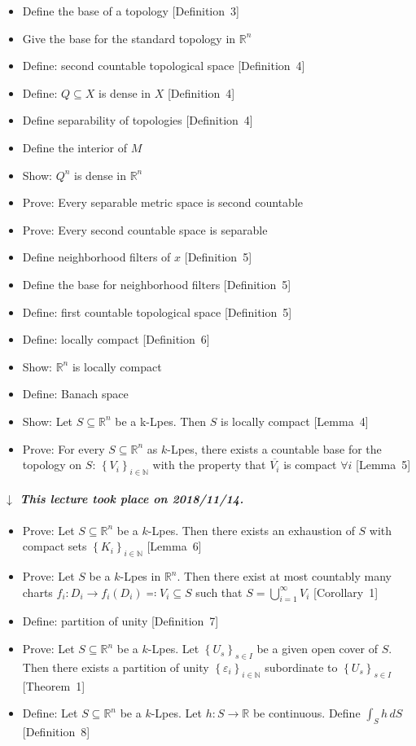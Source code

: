\documentclass{article}
\numberwithin{lecref}{section}
\newcommand{\Set}[1]{\left\{#1\right\}}
\newcommand{\dateref}[1]{%
  \begin{mdframed}[backgroundcolor=gray!10,innerbottommargin=0pt,innertopmargin=0pt]
    \paragraph{\textit{$\downarrow$ This lecture took place on #1.}}%
  \end{mdframed}%
}
\begin{document}
\begin{itemize}
  \item Define the base of a topology [Definition~3]
  \item Give the base for the standard topology in $\mathbb R^n$
  \item Define: second countable topological space [Definition~4]
  \item Define: $Q \subseteq X$ is dense in $X$ [Definition~4]
  \item Define separability of topologies [Definition~4]
  \item Define the interior of $M$
  \item Show: $Q^n$ is dense in $\mathbb R^n$
  \item Prove: Every separable metric space is second countable
  \item Prove: Every second countable space is separable
  \item Define neighborhood filters of $x$ [Definition~5]
  \item Define the base for neighborhood filters [Definition~5]
  \item Define: first countable topological space [Definition~5]
  \item Define: locally compact [Definition~6]
  \item Show: $\mathbb R^n$ is locally compact
  \item Define: Banach space
  \item Show: Let $S \subseteq \mathbb R^n$ be a k-Lpes. Then $S$ is locally compact [Lemma~4]
  \item Prove: For every $S \subseteq \mathbb R^n$ as $k$-Lpes, there exists a countable base for the topology on $S$: $\Set{V_i}_{i \in \mathbb N}$ with the property that $\overline{V_i}$ is compact $\forall i$ [Lemma~5]
\end{itemize}

\dateref{2018/11/14}

\begin{itemize}
  \item Prove: Let $S \subseteq \mathbb R^n$ be a $k$-Lpes. Then there exists an exhaustion of $S$ with compact sets $\Set{K_i}_{i \in \mathbb N}$ [Lemma~6]
  \item Prove: Let $S$ be a $k$-Lpes in $\mathbb R^n$. Then there exist at most countably many charts $f_i: D_i \to f_i(D_i) \eqqcolon V_i \subseteq S$ such that $S = \bigcup_{i=1}^\infty V_i$ [Corollary~1]
  \item Define: partition of unity [Definition~7]
  \item Prove: Let $S \subseteq \mathbb R^n$ be a $k$-Lpes. Let $\Set{U_s}_{s \in I}$ be a given open cover of $S$. Then there exists a partition of unity $\Set{\varepsilon_i}_{i \in \mathbb N}$ subordinate to $\Set{U_s}_{s \in I}$ [Theorem~1]
  \item Define: Let $S \subseteq \mathbb R^n$ be a $k$-Lpes. Let $h: S \to \mathbb R$ be continuous. Define $\int_S h \, dS$ [Definition~8]
\end{itemize}
\end{document}

